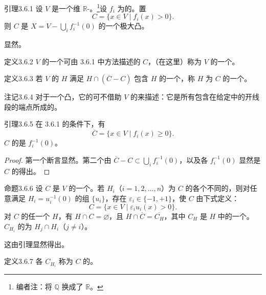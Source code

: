 \begin{SGAresult}{引理}{3.6.1}
设 $V$ 是一个维 $\mathbb R$-。\footnote{编者注：将 $\mathbb Q$ 换成了 $\mathbb R$。}设 $f_i$ 为的。置
\[C=\{x\in V\mid f_i(x)>0\}.\]
则 $C$ 是 $X=V-\bigcup_i f_i^{-1}(0)$ 的一个极大凸。
\end{SGAresult}
显然。
\begin{SGAresult}{定义}{3.6.2}
$V$ 的一个可由 3.6.1 中方法描述的 $C$，（在这里）称为 $V$ 的一个。
\end{SGAresult}
\begin{SGAresult}{定义}{3.6.3}
若 $V$ 的 $H$ 满足 $H\cap(\overline C-C)$ 包含 $H$ 的一个，称 $H$ 为 $C$ 的一个。
\end{SGAresult}
\begin{SGAresult}{注记}{3.6.4}
对于一个凸，它的可不借助 $V$ 的来描述：它是所有包含在给定中的开线段的端点所成的。
\end{SGAresult}
\begin{SGAresult}{引理}{3.6.5}
在 3.6.1 的条件下，有
\[\overline C=\{x\in V\mid f_i(x)\geq0\}.\]
$C$ 的是 $f_i^{-1}(0)$。
\end{SGAresult}
\begin{proof}
第一个断言显然。第二个由 $\overline C-C\subset\bigcup_i f_i^{-1}(0)$，以及各 $f_i^{-1}(0)$ 显然是 $C$ 的得出。
\end{proof}
\begin{SGAresult}{命题}{3.6.6}
设 $C$ 是 $V$ 的一个。若 $H_i$（$i=1,2,\ldots,n$）为 $C$ 的各个不同的，则对任意满足 $H_i=u_i^{-1}(0)$ 的组 $\{u_i\}$，存在 $\varepsilon_i\in\{-1,+1\}$，使 $C$ 由下式定义：
\[C=\{x\in V\mid\varepsilon_i u_i(x)>0\}.\]
对 $C$ 的任一个 $H$，有 $H\cap C=\varnothing$，且 $H\cap\overline C=\overline{C_H}$，其中 $C_H$ 是 $H$ 中的一个。$C_{H_i}$ 的为 $H_j\cap H_i$（$j\ne i$）。
\end{SGAresult}
这由引理显然得出。
\begin{SGAresult}{定义}{3.6.7}
各 $C_{H_i}$ 称为 $C$ 的。
\end{SGAresult}
